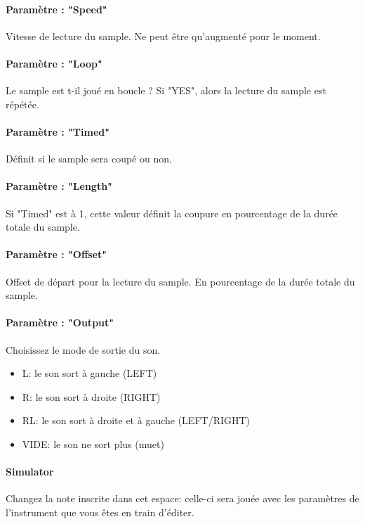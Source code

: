 \documentclass[12pt,a4paper]{article}
\begin{document}
    \paragraph{Paramètre : "Speed"} Vitesse de lecture du sample.
                                    Ne peut être qu'augmenté pour le moment.

    \paragraph{Paramètre : "Loop"} Le sample est t-il joué en boucle ?
                                    Si "YES", alors la lecture du sample est répétée.

    \paragraph{Paramètre : "Timed"} Définit si le sample sera coupé ou non.

    \paragraph{Paramètre : "Length"} Si "Timed" est à 1, cette valeur définit la coupure en pourcentage de la durée totale du sample.

    \paragraph{Paramètre : "Offset"} Offset de départ pour la lecture du sample.
                                    En pourcentage de la durée totale du sample.

    \paragraph{Paramètre : "Output"} Choisissez le mode de sortie du son.
    \medskip

    \begin{itemize}
        \item{L: le son sort à gauche (LEFT)}
        \item{R: le son sort à droite (RIGHT)}
        \item{RL: le son sort à droite et à gauche (LEFT/RIGHT)}
        \item{VIDE: le son ne sort plus (muet)}
    \end{itemize}

    \paragraph{Simulator} Changez la note inscrite dans cet espace:
            celle-ci sera jouée avec les paramètres de l'instrument que vous êtes en train d'éditer.
    
\end{document}
